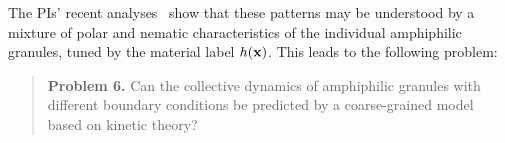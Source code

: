 %
The PIs' recent analyses~\cite{fu-ryh-qua-you2022} show that these
patterns may be understood by a mixture of polar and nematic
characteristics of the individual amphiphilic granules, tuned by the
material label $h({\mathbf{x}})$. This leads to the following problem:
%
\begin{quotation}
  \noindent
  \textbf{Problem 6.} Can the collective dynamics of amphiphilic
  granules with different boundary conditions be predicted by a
  coarse-grained model based on kinetic theory?
\end{quotation}
%
